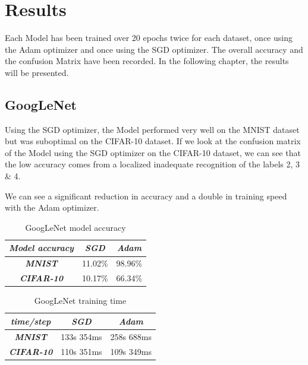 \documentclass[conference]{IEEEtran}
\begin{document}
\section{Results}
Each Model has been trained over 20 epochs twice for each dataset, once using the Adam optimizer and once using the SGD optimizer. 
The overall accuracy and the confusion Matrix have been recorded. In the following chapter, the results will be presented.

\subsection{GoogLeNet}
Using the SGD optimizer, the Model performed very well on the MNIST dataset but was suboptimal on the CIFAR-10 dataset. 
If we look at the confusion matrix of the Model using the SGD optimizer on the CIFAR-10 dataset, we can see that the low accuracy comes from a localized inadequate recognition of the labels 2, 3 \& 4.

We can see a significant reduction in accuracy and a double in training speed with the Adam optimizer.

\begin{table}[htbp]
    \caption{GoogLeNet model accuracy}
    \begin{center}
    \begin{tabular}{|c|c|c|}
    \cline{1-3} 
    \textit{Model accuracy} & \textbf{\textit{SGD}}& \textbf{\textit{Adam}} \\
    \hline
    \textbf{\textit{MNIST}} & 11.02\% & 98.96\% \\
    \hline
    \textbf{\textit{CIFAR-10}} & 10.17\% & 66.34\% \\
    \cline{1-3} 
    \end{tabular}
    \label{tab: GoogLeNet model accuracy}
    \end{center}
\end{table}

\begin{table}[htbp]
    \caption{GoogLeNet training time}
    \begin{center}
    \begin{tabular}{|c|c|c|}
    \cline{1-3} 
    \textit{time/step} & \textbf{\textit{SGD}}& \textbf{\textit{Adam}} \\
    \hline
    \textbf{\textit{MNIST}} & 133s 354ms & 258s 688ms \\
    \hline
    \textbf{\textit{CIFAR-10}} & 110s 351ms & 109s 349ms \\
    \cline{1-3} 
    \end{tabular}
    \label{tab: GoogLeNet training time}
    \end{center}
\end{table}
\end{document}

